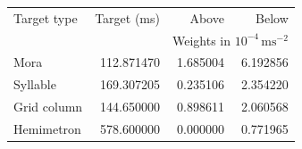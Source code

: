 \begin{tabular}{lrrr}\toprule
Target type & Target (ms) & Above & Below\\
 & & \multicolumn{2}{c}{Weights in $10^{-4}\,\mathrm{ms}^{-2}$}\\\midrule
Mora & 112.871470 & 1.685004 & 6.192856 \\
Syllable & 169.307205 & 0.235106 & 2.354220 \\
Grid column & 144.650000 & 0.898611 & 2.060568 \\
Hemimetron & 578.600000 & 0.000000 & 0.771965 \\
\bottomrule\end{tabular}
